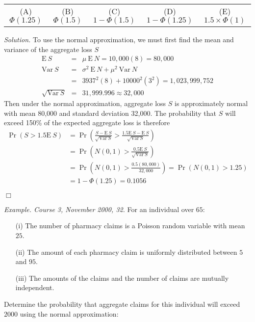 \documentclass[12pt,letterpaper]{article}
\begin{document}
\bigskip

\begin{tabular}{ c c c c c}
(A) $\Phi (1.25)$ & (B) $\Phi (1.5)$ & (C) $1-\Phi (1.5)$ & (D) $1-\Phi (1.25)$ & (E) $1.5 \times \Phi (1)$
\end{tabular}

\bigskip

\noindent \textit{Solution.} To use the normal approximation, we must first find the mean and variance of the aggregate loss $S$
\begin{eqnarray*}
\mathrm{E~}S &=& \mu \ \mathrm{E~}N = 10,000(8) = 80,000\\
\mathrm{Var~}S &=& \sigma^2 \ \mathrm{E~}N + \mu^2 \ \mathrm{Var~}N\\
&=& 3937^2(8) + 10000^2 (3^2) = 1,023,999,752\\
\sqrt{\mathrm{Var~}S} &=& 31,999.996 \approx 32,000
\end{eqnarray*}
Then under the normal approximation, aggregate loss $S$ is approximately normal with mean 80,000 and standard deviation 32,000. The probability that $S$ will exceed 150\% of the expected aggregate loss is therefore
\begin{align*}
\Pr(S>1.5 \mathrm{E~}S) &= \Pr \left( \frac{S - \mathrm{E~} S}{\sqrt{\mathrm{Var~}S}} > \frac{1.5 \mathrm{E~}S - \mathrm{E~} S}{\sqrt{\mathrm{Var~}S}} \right) \\
&= \Pr \left( N(0,1) > \frac{0.5 \mathrm{E~}S}{\sqrt{\mathrm{Var~}S} } \right) \\
&= \Pr \left( N(0,1) > \frac{0.5(80,000)}{32,000} \right) = \Pr( N(0,1) > 1.25) \\
&= 1-\Phi(1.25) = 0.1056
\end{align*}
\begin{flushright}$\Box$\end{flushright}


\noindent \textit{Example. Course 3, November 2000, 32.} For an individual over $65$:
\begin{enumerate}
	\item[(i)] The number of pharmacy claims is a Poisson random variable with mean $25$.
	\item[(ii)] The amount of each pharmacy claim is uniformly distributed between $5$ and $95$.
	\item[(iii)] The amounts of the claims and the number of claims are mutually independent.
\end{enumerate}
Determine the probability that aggregate claims for this individual will exceed $2000$ using the normal approximation:
\end{document}
